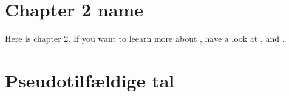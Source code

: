 \chapter{Chapter 2 name}\label{ch:ch2label}
Here is chapter 2. If you want to leearn  more about \LaTeXe{}, have a look at \cite{Madsen2010}, \cite{Oetiker2010} and \cite{Mittelbach2005}.

\chapter{Pseudotilfældige tal}
